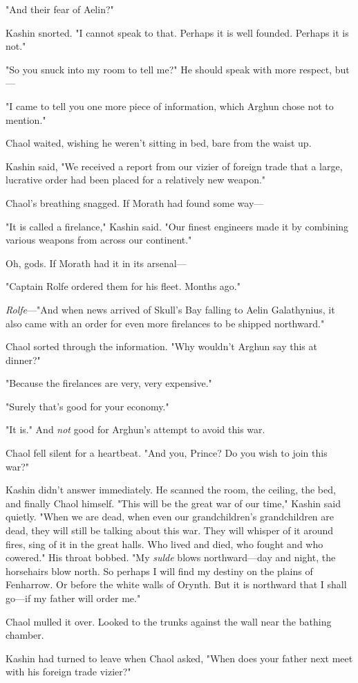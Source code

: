 "And their fear of Aelin?"

Kashin snorted. "I cannot speak to that. Perhaps it is well founded. Perhaps it is not."

"So you snuck into my room to tell me?" He should speak with more respect, but---

"I came to tell you one more piece of information, which Arghun chose not to mention."

Chaol waited, wishing he weren't sitting in bed, bare from the waist up.

Kashin said, "We received a report from our vizier of foreign trade that a large, lucrative order had been placed for a relatively new weapon."

Chaol's breathing snagged. If Morath had found some way---

"It is called a firelance," Kashin said. "Our finest engineers made it by combining various weapons from across our continent."

Oh, gods. If Morath had it in its arsenal---

"Captain Rolfe ordered them for his fleet. Months ago."

\emph{Rolfe}---"And when news arrived of Skull's Bay falling to Aelin Galathynius, it also came with an order for even more firelances to be shipped northward."

Chaol sorted through the information. "Why wouldn't Arghun say this at dinner?"

"Because the firelances are very, very expensive."

"Surely that's good for your economy."

"It is." And \emph{not} good for Arghun's attempt to avoid this war.

Chaol fell silent for a heartbeat. "And you, Prince? Do you wish to join this war?"

Kashin didn't answer immediately. He scanned the room, the ceiling, the bed, and finally Chaol himself. "This will be the great war of our time," Kashin said quietly. "When we are dead, when even our grandchildren's grandchildren are dead, they will still be talking about this war. They will whisper of it around fires, sing of it in the great halls. Who lived and died, who fought and who cowered." His throat bobbed. "My \emph{sulde} blows northward---day and night, the horsehairs blow north. So perhaps I will find my destiny on the plains of Fenharrow. Or before the white walls of Orynth. But it is northward that I shall go---if my father will order me."

Chaol mulled it over. Looked to the trunks against the wall near the bathing chamber.

Kashin had turned to leave when Chaol asked, "When does your father next meet with his foreign trade vizier?"

